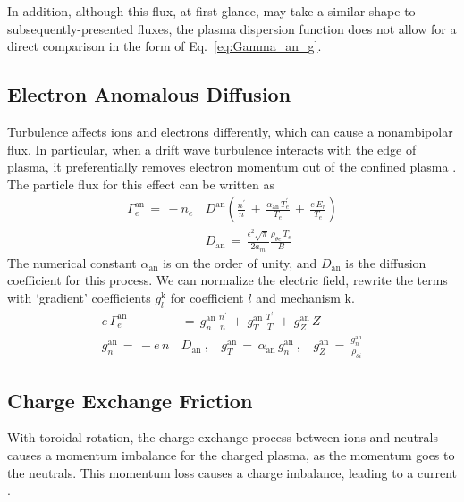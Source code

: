In addition, although this flux, at first glance, may take a similar shape to subsequently-presented fluxes, the plasma dispersion function does not allow for a direct comparison in the form of Eq.~\ref{eq:Gamma_an_g}.

\subsection{Electron Anomalous Diffusion}\label{ssec:an_diffusion}
Turbulence affects ions and electrons differently, which can cause a nonambipolar flux.
In particular, when a drift wave turbulence interacts with the edge of plasma, it preferentially removes electron momentum out of the confined plasma \cite{itoh_model_1988} \cite{stringer_non-ambipolar_1995}.
The particle flux for this effect can be written as
\begin{align} %
	\Gamma_e^\text{an} \,=\, -n_e \, &D^\text{an} \left(\frac{n^\prime}{n} \,+\,
		\frac{\alpha_\text{an}\,T_e^\prime}{T_e} \,+\, \frac{e\,E_r}{T_e}\right)
		\label{eq:Gamma_an_orig} \\
	&D_\text{an} \,=\, \frac{\epsilon^2 \sqrt{\pi}}{2 a_m}
		\frac{\rho_{\theta e} \, T_e}{B} \label{eq:D_an}
\end{align}
The numerical constant $\alpha_\text{an}$ is on the order of unity, and $D_\text{an}$ is the diffusion coefficient for this process.
We can normalize the electric field, rewrite the terms with `gradient' coefficients $g_l^\text{k}$ for coefficient $l$ and mechanism $\text{k}$.
\begin{align} %
	e\,\Gamma_e^\text{an} \,&=\, g_n^\text{an}\,\frac{n^\prime}{n} \,+\,
		g_T^\text{an}\,\frac{T^\prime}{T} \,+\,
		g_Z^\text{an}\,Z \label{eq:Gamma_an_g} \\
	g_n^\text{an} \,=\, -e \, n \, &D_\text{an}~,~~~~
		g_T^\text{an} \,=\, \alpha_\text{an} \, g_n^\text{an}~,~~~~
		g_Z^\text{an} \,=\, \frac{g_n^\text{an}}{\rho_{\theta i}}
		\label{eq:g_an}
\end{align}

\subsection{Charge Exchange Friction}\label{ssec:cx_friction}
With toroidal rotation, the charge exchange process between ions and neutrals causes a momentum imbalance for the charged plasma, as the momentum goes to the neutrals.
This momentum loss causes a charge imbalance, leading to a current \cite{toda_theoretical_1997}.

